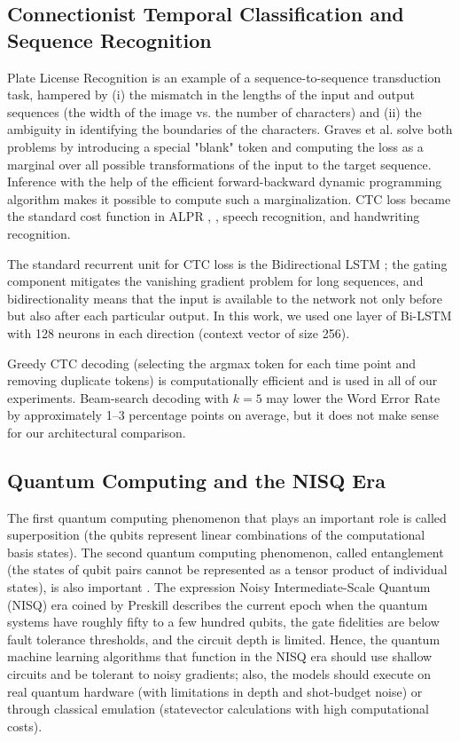 \documentclass{ieeeaccess}
\begin{document}
\subsection{Connectionist Temporal Classification and Sequence Recognition}
Plate License Recognition is an example of a sequence-to-sequence transduction task, hampered by (i) the mismatch in the lengths of the input and output sequences (the width of the image vs. the number of characters) and (ii) the ambiguity in identifying the boundaries of the characters. Graves et al. \cite{b3} solve both problems by introducing a special "blank" token and computing the loss as a marginal over all possible transformations of the input to the target sequence. Inference with the help of the efficient forward-backward dynamic programming algorithm makes it possible to compute such a marginalization. CTC loss became the standard cost function in ALPR \cite{b12}, \cite{b14}, speech recognition, and handwriting recognition.

The standard recurrent unit for CTC loss is the Bidirectional LSTM \cite{b7}; the gating component mitigates the vanishing gradient problem for long sequences, and bidirectionality means that the input is available to the network not only before but also after each particular output. In this work, we used one layer of Bi-LSTM with 128 neurons in each direction (context vector of size 256).

Greedy CTC decoding (selecting the argmax token for each time point and removing duplicate tokens) is computationally efficient and is used in all of our experiments. Beam-search decoding with $k = 5$ may lower the Word Error Rate by approximately 1--3 percentage points on average, but it does not make sense for our architectural comparison.

\subsection{Quantum Computing and the NISQ Era}
The first quantum computing phenomenon that plays an important role is called superposition (the qubits represent linear combinations of the computational basis states). The second quantum computing phenomenon, called entanglement (the states of qubit pairs cannot be represented as a tensor product of individual states), is also important \cite{b9}. The expression Noisy Intermediate-Scale Quantum (NISQ) era coined by Preskill \cite{b25} describes the current epoch when the quantum systems have roughly fifty to a few hundred qubits, the gate fidelities are below fault tolerance thresholds, and the circuit depth is limited. Hence, the quantum machine learning algorithms that function in the NISQ era should use shallow circuits and be tolerant to noisy gradients; also, the models should execute on real quantum hardware (with limitations in depth and shot-budget noise) or through classical emulation (statevector calculations with high computational costs).
\end{document}
